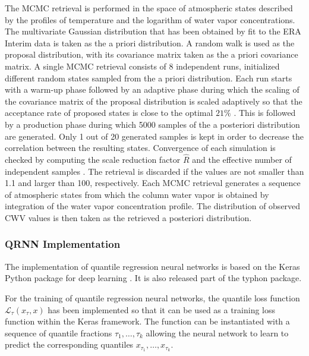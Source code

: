 \documentclass[journal abbreviation, manuscript]{copernicus}
\begin{document}
  The MCMC retrieval is performed in the space of atmospheric states described
  by the profiles of temperature and the logarithm of water vapor concentrations. The
  multivariate Gaussian distribution that has been obtained by fit to the ERA
  Interim data is taken as the a priori distribution. A random walk is used as
  the proposal distribution, with its covariance matrix taken as the a priori
  covariance matrix. A single MCMC retrieval consists of 8 independent runs,
  initialized  different random states sampled from the a priori
  distribution. Each run starts with a warm-up phase followed by an adaptive
  phase during which the scaling of the covariance matrix of the proposal
  distribution is scaled adaptively so that the acceptance rate of proposed states is
  close to the optimal $21\%$ \citep{bda}. This is followed by a production
  phase during which 5000 samples of the a posteriori distribution are
  generated. Only 1 out of 20 generated samples is kept in order to decrease the
  correlation between the resulting states. Convergence of each simulation is
  checked by computing the scale reduction factor $\hat{R}$ and the effective
  number of independent samples \citep[eqs. (11.12), (11.13)]{bda}. The
  retrieval is discarded if the values are not smaller than 1.1 and larger than
  100, respectively. Each MCMC retrieval generates a sequence of atmospheric
  states from which the column water vapor is obtained by integration of the
  water vapor concentration profile. The distribution of observed CWV values
  is then taken as the retrieved a posteriori distribution.

  
\subsubsection{QRNN Implementation}
\label{sec:implementation_qrnn}

  The implementation of quantile regression neural networks is based on the
  Keras Python package for deep learning \citep{keras}. It is also released
  part of the typhon package.

  For the training of quantile regression neural networks, the quantile loss
  function $\mathcal{L}_\tau(x_\tau, x)$ has been implemented so that it can be
  used as a training loss function within the Keras framework. The function can
  be instantiated with a sequence of quantile fractions $\tau_1, \ldots,
  \tau_k$ allowing the neural network to learn to predict the corresponding
  quantiles $x_{\tau_1}, \ldots, x_{\tau_k}$.
\end{document}
